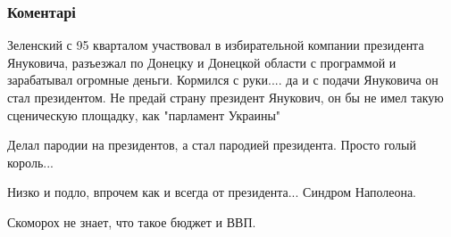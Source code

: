  
 
 
 
 
\subsubsection{Коментарі}

\begin{itemize}
 

Зеленский с 95 кварталом участвовал в избирательной компании президента
Януковича, разъезжал по Донецку и Донецкой области с программой и зарабатывал
огромные деньги. Кормился с руки.... да и с подачи Януковича он стал
президентом. Не предай страну президент Янукович, он бы не имел такую
сценическую площадку, как "парламент Украины"


 
Делал пародии на президентов, а стал пародией президента. Просто голый король...

 
Низко и подло, впрочем как и всегда от президента... Синдром Наполеона.

 
Скоморох не знает, что такое бюджет и ВВП.


\end{itemize}
